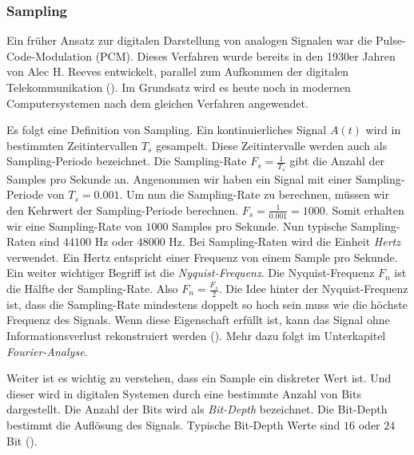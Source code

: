 \documentclass[11pt,a4paper]{article}
\begin{document}
\subsubsection{Sampling}
Ein früher Ansatz zur digitalen Darstellung von analogen Signalen war die Pulse-Code-Modulation
(PCM). Dieses Verfahren wurde bereits in den 1930er Jahren von Alec H. Reeves entwickelt,
parallel zum Aufkommen der digitalen Telekommunikation (\cite[p.~57]{deloraine1965pcm}).
Im Grundsatz wird es heute noch in modernen Computersystemen nach dem gleichen Verfahren angewendet.

\noindent \newline
Es folgt eine Definition von Sampling. Ein kontinuierliches Signal \(A(t)\)
wird in bestimmten Zeitintervallen \(T_s\) gesampelt. Diese Zeitintervalle werden auch als
Sampling-Periode bezeichnet. Die Sampling-Rate \(F_s = \displaystyle\frac{1}{T_s}\) gibt die Anzahl
der Samples pro Sekunde an. Angenommen wir haben ein Signal mit einer Sampling-Periode
von \(T_s = 0.001\). Um nun die Sampling-Rate zu berechnen, müssen wir den Kehrwert der
Sampling-Periode berechnen. \(F_s = \displaystyle\frac{1}{0.001} = 1000\). Somit erhalten wir eine
Sampling-Rate von \(1000\) Samples pro Sekunde. Nun typische Sampling-Raten sind \(44100\) Hz
oder \(48000\) Hz. Bei Sampling-Raten wird die Einheit \textit{Hertz} verwendet. Ein Hertz entspricht
einer Frequenz von einem Sample pro Sekunde. Ein weiter wichtiger Begriff ist die
\textit{Nyquist-Frequenz}. Die Nyquist-Frequenz \(F_n\) ist die Hälfte der Sampling-Rate.
Also \(F_n = \displaystyle\frac{F_s}{2}\). Die Idee hinter der Nyquist-Frequenz ist, dass die
Sampling-Rate mindestens doppelt so hoch sein muss wie die höchste Frequenz des Signals. Wenn diese
Eigenschaft erfüllt ist, kann das Signal ohne Informationsverlust rekonstruiert werden
(\cite[Chapter~3.1]{tarr2018hackaudio}). Mehr dazu folgt im Unterkapitel
\textit{Fourier-Analyse}.

\noindent \newline
Weiter ist es wichtig zu verstehen, dass ein Sample ein diskreter Wert ist. Und dieser wird in
digitalen Systemen durch eine bestimmte Anzahl von Bits dargestellt. Die Anzahl der Bits wird
als \textit{Bit-Depth} bezeichnet. Die Bit-Depth bestimmt die Auflösung des Signals. Typische
Bit-Depth Werte sind \(16\) oder \(24\) Bit (\cite[p.10]{somberg2019audioapi}).
\end{document}
